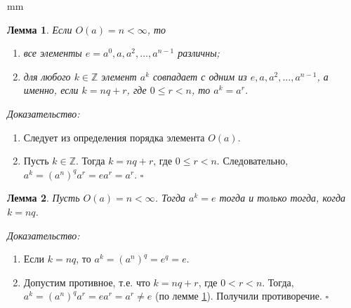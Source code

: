 \documentclass[12pt,english,russian]{article}
\newtheorem{lemma}{Лемма}
\begin{document}
		 mm
	\begin{lemma}
	\label{lemma1}
		Если $O(a) = n < \infty$, то
		\begin{enumerate}
			\item все элементы $e = a^0,a,a^2,\dots ,a^{n-1}$ различны;
			\item для любого $k \in \mathbb{Z}$ элемент $a^k$ совпадает с одним из
			$e,a,a^2,\dots ,a^{n-1}$, а именно, если $k=nq+r$, где
			$0 \leq r < n$, то $a^k=a^r$.
		\end{enumerate}
	\end{lemma}
	\textit{Доказательство:}
	\begin{enumerate}
		\item Следует из определения порядка элемента $O(a)$.
		\item Пусть $k \in \mathbb{Z}$. Тогда $k=nq+r$, где $0 \leq r < n$. 
		Следовательно, $a^k = (a^n)^qa^r = ea^r = a^r$. \quad $\square$
	\end{enumerate}
	
	\begin{lemma}
	\label{lemma2}
		Пусть $O(a) = n < \infty$. Тогда $a^k = e$ тогда и только тогда, когда $k = nq$.
	\end{lemma}
	\textit{Доказательство:}
	\begin{enumerate}
		\item Если  $k = nq$, то $a^k = (a^n)^q = e^q = e$.
		\item Допустим противное, т.е. что $k=nq+r$, где $0 < r < n$. 
		Тогда, $a^k = (a^n)^qa^r = ea^r = a^r\ne e$ (по лемме \ref{lemma1}).  Получили противоречие. \quad $\square$
	\end{enumerate}
	
\end{document}

